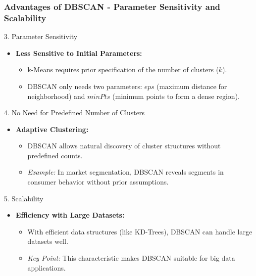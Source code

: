 \documentclass[aspectratio=169]{beamer}
\begin{document}
\begin{frame}[fragile]
    \frametitle{Advantages of DBSCAN - Parameter Sensitivity and Scalability}
    \begin{block}{3. Parameter Sensitivity}
        \begin{itemize}
            \item \textbf{Less Sensitive to Initial Parameters:}
                \begin{itemize}
                    \item k-Means requires prior specification of the number of clusters ($k$).
                    \item DBSCAN only needs two parameters: $eps$ (maximum distance for neighborhood) and $minPts$ (minimum points to form a dense region).
                \end{itemize}
        \end{itemize}
    \end{block}
    
    \begin{block}{4. No Need for Predefined Number of Clusters}
        \begin{itemize}
            \item \textbf{Adaptive Clustering:}
            \begin{itemize}
                \item DBSCAN allows natural discovery of cluster structures without predefined counts.
                \item \textit{Example:} In market segmentation, DBSCAN reveals segments in consumer behavior without prior assumptions.
            \end{itemize}
        \end{itemize}
    \end{block}

    \begin{block}{5. Scalability}
        \begin{itemize}
            \item \textbf{Efficiency with Large Datasets:}
            \begin{itemize}
                \item With efficient data structures (like KD-Trees), DBSCAN can handle large datasets well.
                \item \textit{Key Point:} This characteristic makes DBSCAN suitable for big data applications.
            \end{itemize}
        \end{itemize}
    \end{block}
\end{frame}
\end{document}
